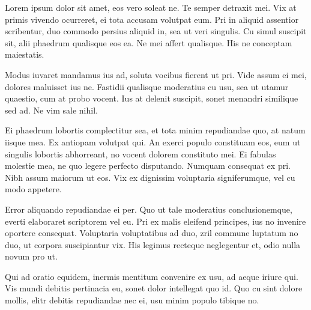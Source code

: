 \documentclass[11pt,a4paper]{report}
\begin{document}
    Lorem ipsum dolor sit amet, eos vero soleat ne. Te semper detraxit mei. Vix at primis vivendo ocurreret, ei tota accusam volutpat eum. Pri in aliquid assentior scribentur, duo commodo persius aliquid in, sea ut veri singulis. Cu simul suscipit sit, alii phaedrum qualisque eos ea. Ne mei affert qualisque. His ne conceptam maiestatis.
    
    Modus iuvaret mandamus ius ad, soluta vocibus fierent ut pri. Vide assum ei mei, dolores maluisset ius ne. Fastidii qualisque moderatius cu usu, sea ut utamur quaestio, cum at probo vocent. Ius at delenit suscipit, sonet menandri similique sed ad. Ne vim sale nihil.
    
    Ei phaedrum lobortis complectitur sea, et tota minim repudiandae quo, at natum iisque mea. Ex antiopam volutpat qui. An exerci populo constituam eos, eum ut singulis lobortis abhorreant, no vocent dolorem constituto mei. Ei fabulas molestie mea, ne quo legere perfecto disputando. Numquam consequat ex pri. Nibh assum maiorum ut eos. Vix ex dignissim voluptaria signiferumque, vel cu modo appetere.
    
    Error aliquando repudiandae ei per. Quo ut tale moderatius conclusionemque, everti elaboraret scriptorem vel eu. Pri ex malis eleifend principes, ius no invenire oportere consequat. Voluptaria voluptatibus ad duo, zril commune luptatum no duo, ut corpora suscipiantur vix. His legimus recteque neglegentur et, odio nulla novum pro ut.
    
    Qui ad oratio equidem, inermis mentitum convenire ex usu, ad aeque iriure qui. Vis mundi debitis pertinacia eu, sonet dolor intellegat quo id. Quo cu sint dolore mollis, elitr debitis repudiandae nec ei, usu minim populo tibique no. 
\end{document}
